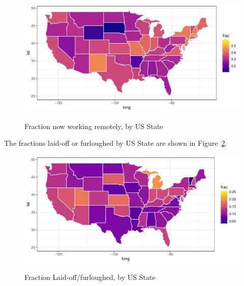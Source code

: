 \documentclass[12pt]{article}
\begin{document}
\begin{figure}
  \caption{Fraction now working remotely, by US State} \label{fig:geo_wfh}
\centering
\begin{minipage}{1.0 \linewidth}
  \includegraphics[width = \linewidth]{plots/geo_wfh.pdf} \\
  \begin{footnotesize}
    \end{footnotesize}
\end{minipage}
\end{figure} 

The fractions laid-off or furloughed by US State are shown in Figure~\ref{fig:geo_laidoff}.

\begin{figure}
  \caption{Fraction Laid-off/furloughed, by US State} \label{fig:geo_laidoff}
\centering
\begin{minipage}{1.0 \linewidth}
  \includegraphics[width = \linewidth]{plots/geo_laidoff.pdf} \\
  \begin{footnotesize}
    \end{footnotesize}
\end{minipage}
\end{figure} 
\end{document}
